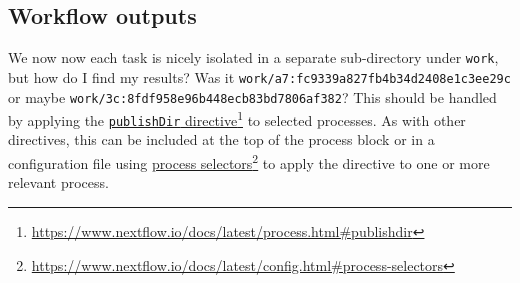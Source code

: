 \subsection{Workflow outputs}

We now now each task is nicely isolated in a separate sub-directory under \texttt{work}, but how do I find my results? Was it \texttt{work/a7:fc9339a827fb4b34d2408e1c3ee29c} or maybe \texttt{work/3c:8fdf958e96b448ecb83bd7806af382}? This should be handled by applying the \href{https://www.nextflow.io/docs/latest/process.html#publishdir}{\texttt{publishDir} directive}\footnote{\url{https://www.nextflow.io/docs/latest/process.html\#publishdir}} to selected processes. As with other directives, this can be included at the top of the process block or in a configuration file using \href{https://www.nextflow.io/docs/latest/config.html#process-selectors}{process selectors}\footnote{\url{https://www.nextflow.io/docs/latest/config.html\#process-selectors}} to apply the directive to one or more relevant process. 



%

